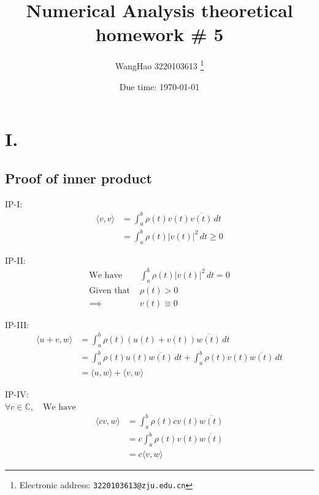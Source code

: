 \documentclass[a4paper]{article}
\begin{document}
\title{Numerical Analysis theoretical homework \# 5}

\author{WangHao 3220103613
  \thanks{Electronic address: \texttt{3220103613@zju.edu.cn}}}


\date{Due time: \today}

\maketitle
\section*{I.}

\subsection*{Proof of inner product}

IP-I:
\begin{align*}
\langle v, v \rangle &= \int_{a}^{b} \rho(t) v(t) \overline{v(t)} \, dt \\
&= \int_{a}^{b} \rho(t) |v(t)|^2 \, dt \geq 0
\end{align*}

IP-II:
\begin{align*}
\text{We have } & \int_{a}^{b} \rho(t) |v(t)|^2 \, dt = 0 \\
\text{Given that } & \rho(t) > 0 \\
\implies & v(t) \equiv 0
\end{align*}

IP-III:
\begin{align*}
\langle u+v, w \rangle &= \int_{a}^{b} \rho(t) \left( u(t) + v(t) \right) \overline{w(t)} \, dt \\
&= \int_{a}^{b} \rho(t) u(t) \overline{w(t)} \, dt + \int_{a}^{b} \rho(t) v(t) \overline{w(t)} \, dt \\
&= \langle u, w \rangle + \langle v, w \rangle
\end{align*}

IP-IV:\\
$\forall c \in \mathbb{C}, \quad \text{We have}$
\begin{align*}
\langle cv, w \rangle &= \int_a^b \rho(t) cv(t) \overline{w(t)} \\
&= c \int_a^b \rho(t) v(t) \overline{w(t)} \\
&= c \langle v, w \rangle
\end{align*}
\end{document}
